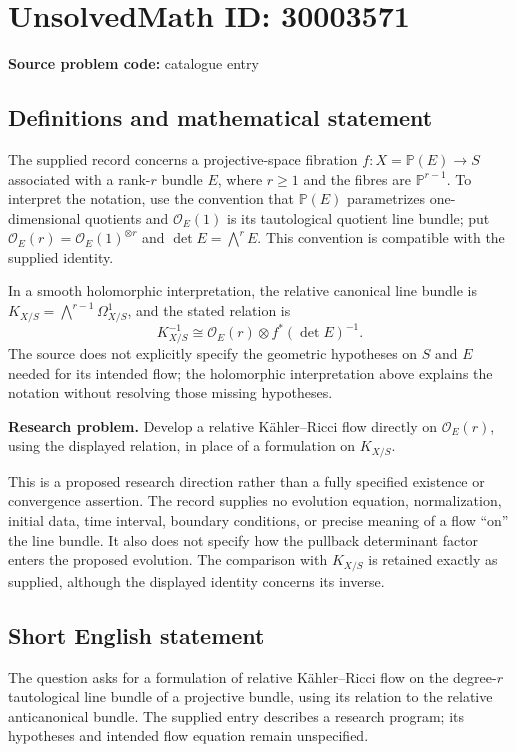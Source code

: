\documentclass[11pt]{article}
\newcommand{\PP}{\mathbb{P}}
\begin{document}
\section*{UnsolvedMath ID: 30003571}
\textbf{Source problem code:} catalogue entry
\subsection{Definitions and mathematical statement}
The supplied record concerns a projective-space fibration \(f:X=\PP(E)\to S\) associated with a rank-\(r\) bundle \(E\), where \(r\geq 1\) and the fibres are \(\PP^{r-1}\). To interpret the notation, use the convention that \(\PP(E)\) parametrizes one-dimensional quotients and \(\mathcal O_E(1)\) is its tautological quotient line bundle; put \(\mathcal O_E(r)=\mathcal O_E(1)^{\otimes r}\) and \(\det E=\bigwedge^r E\). This convention is compatible with the supplied identity.

In a smooth holomorphic interpretation, the relative canonical line bundle is \(K_{X/S}=\bigwedge^{r-1}\Omega^1_{X/S}\), and the stated relation is
\[
K_{X/S}^{-1}\cong\mathcal O_E(r)\otimes f^*(\det E)^{-1}.
\]
The source does not explicitly specify the geometric hypotheses on \(S\) and \(E\) needed for its intended flow; the holomorphic interpretation above explains the notation without resolving those missing hypotheses.

\textbf{Research problem.} Develop a relative K\"ahler--Ricci flow directly on \(\mathcal O_E(r)\), using the displayed relation, in place of a formulation on \(K_{X/S}\).

This is a proposed research direction rather than a fully specified existence or convergence assertion. The record supplies no evolution equation, normalization, initial data, time interval, boundary conditions, or precise meaning of a flow ``on'' the line bundle. It also does not specify how the pullback determinant factor enters the proposed evolution. The comparison with \(K_{X/S}\) is retained exactly as supplied, although the displayed identity concerns its inverse.
\subsection{Short English statement}
The question asks for a formulation of relative K\"ahler--Ricci flow on the degree-\(r\) tautological line bundle of a projective bundle, using its relation to the relative anticanonical bundle. The supplied entry describes a research program; its hypotheses and intended flow equation remain unspecified.
\end{document}
